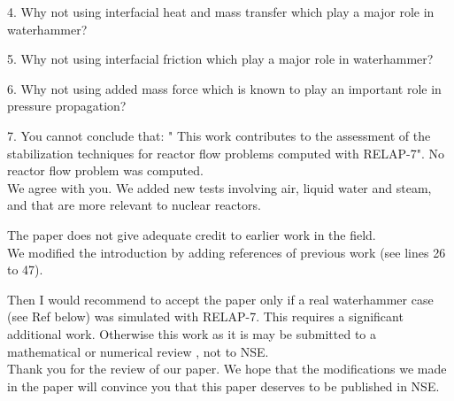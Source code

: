 \documentclass{article}
\begin{document}
{\color{blue}
4. Why not using interfacial heat and mass transfer which play a major role in waterhammer? \\
}

\bigskip

{\color{blue}
5. Why not using interfacial friction which play a major role in waterhammer? \\
}

\bigskip

{\color{blue}
6. Why not using added mass force which is known to play an important role in pressure propagation? \\
}

\bigskip

{\color{blue}
7. You cannot conclude that: " This work contributes to the assessment of the stabilization techniques for reactor flow problems computed with RELAP-7". No reactor flow problem was computed. \\
}
We agree with you. We added new tests involving air, liquid water and steam, and that are more relevant to nuclear reactors. 
\bigskip

{\color{blue}
The paper does not give adequate credit to earlier work in the field. \\
}
We modified the introduction by adding references of previous work (see lines 26 to 47).

\bigskip

{\color{blue}
Then I would recommend to accept the paper only if a real waterhammer case (see Ref below) was simulated with RELAP-7. This requires a significant additional work.
Otherwise this work as it is may be submitted to a mathematical or numerical review , not to NSE. \\
}
Thank you for the review of our paper. We hope that the modifications we made in the paper will convince you that this paper deserves to be published in NSE.
\end{document}
